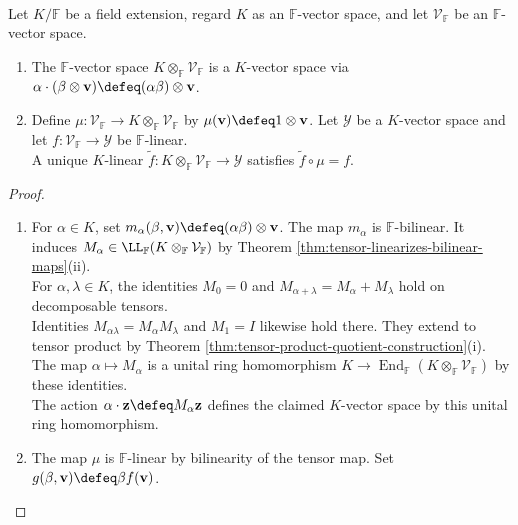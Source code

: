 \begin{proposition} \label{prop:scalar-extension-by-tensor-product} \\
Let $K/\mathbb{F}$ be a field extension, regard $K$ as an $\mathbb{F}$-vector space, and let $\mathcal{V}_{\mathbb{F}}$ be an $\mathbb{F}$-vector space.
\begin{enumerate}[label=(\roman*)]
\setlength{\itemsep}{0pt}
\item The $\mathbb{F}$-vector space $K\otimes_{\mathbb{F}}\mathcal{V}_{\mathbb{F}}$ is a $K$-vector space via $\alpha\cdot(\beta\otimes\mathbf{v})\defeq(\alpha\beta)\otimes\mathbf{v}$.
\item Define $\mu:\mathcal{V}_{\mathbb{F}}\to K\otimes_{\mathbb{F}}\mathcal{V}_{\mathbb{F}}$ by $\mu(\mathbf{v})\defeq1\otimes\mathbf{v}$. Let $\mathcal{Y}$ be a $K$-vector space and let $f:\mathcal{V}_{\mathbb{F}}\to\mathcal{Y}$ be $\mathbb{F}$-linear.\\
A unique $K$-linear $\widetilde{f}:K\otimes_{\mathbb{F}}\mathcal{V}_{\mathbb{F}}\to\mathcal{Y}$ satisfies $\widetilde{f}\circ\mu=f$.
\end{enumerate}
\begin{proof}
\begin{enumerate}[label=(\roman*)]
\setlength{\itemsep}{0pt}
\item For $\alpha\in K$, set $m_\alpha(\beta,\mathbf{v})\defeq(\alpha\beta)\otimes\mathbf{v}$. The map $m_\alpha$ is $\mathbb{F}$-bilinear. It induces $M_\alpha\in\LL_{\mathbb{F}}(K\otimes_{\mathbb{F}}\mathcal{V}_{\mathbb{F}})$ by Theorem \ref{thm:tensor-linearizes-bilinear-maps}(ii).\\
For $\alpha,\lambda\in K$, the identities $M_0=0$ and $M_{\alpha+\lambda}=M_\alpha+M_\lambda$ hold on decomposable tensors.\\
Identities $M_{\alpha\lambda}=M_\alpha M_\lambda$ and $M_1=I$ likewise hold there. They extend to tensor product by Theorem \ref{thm:tensor-product-quotient-construction}(i).\\
The map $\alpha\mapsto M_\alpha$ is a unital ring homomorphism $K\to\operatorname{End}_{\mathbb{F}}(K\otimes_{\mathbb{F}}\mathcal{V}_{\mathbb{F}})$ by these identities.\\
The action $\alpha\cdot\mathbf{z}\defeq M_\alpha\mathbf{z}$ defines the claimed $K$-vector space by this unital ring homomorphism.
\item The map $\mu$ is $\mathbb{F}$-linear by bilinearity of the tensor map. Set $g(\beta,\mathbf{v})\defeq\beta f(\mathbf{v})$.\\

\end{enumerate}
\end{proof}
\end{proposition}

